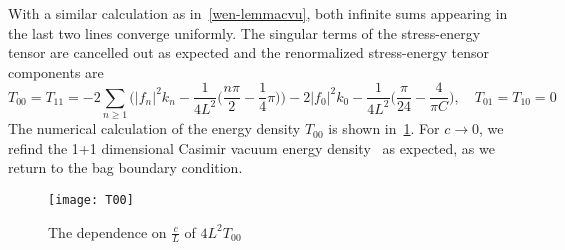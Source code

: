 With a similar calculation as in~\cref{wen-lemmacvu}, both infinite sums appearing in the last two lines converge uniformly.
The singular terms of the stress-energy tensor are cancelled out as expected and the renormalized stress-energy tensor components are
\begin{equation*}
T_{00} = T_{11}= - 2 \sum_{n \geq 1} \Big( |f_n|^2 k_n - 
\frac{1}{4L^2}\big(\frac{n\pi}{2} - \frac 1 4 \pi \big) \Big)
-2|f_0|^2k_0-\frac{1}{4L^2}\big(\frac{\pi}{24} - \frac{4}{\pi C}\big)
 , \quad
T_{01}=T_{10}  = 0
\end{equation*}
The numerical calculation of the energy density $T_{00}$ is shown in~\cref{plotex1d}.
For $c \rightarrow 0$, we refind the 1+1 dimensional Casimir vacuum energy density~\cite{Sundberg2003} as expected, as we return to the bag boundary condition.
%
\begin{figure}[!h]
  \centering
  \texttt{[image: T00]}
  \caption{The dependence on $\frac{c}{L}$ of $4L^2T_{00}$}\label{plotex1d}
\end{figure}






